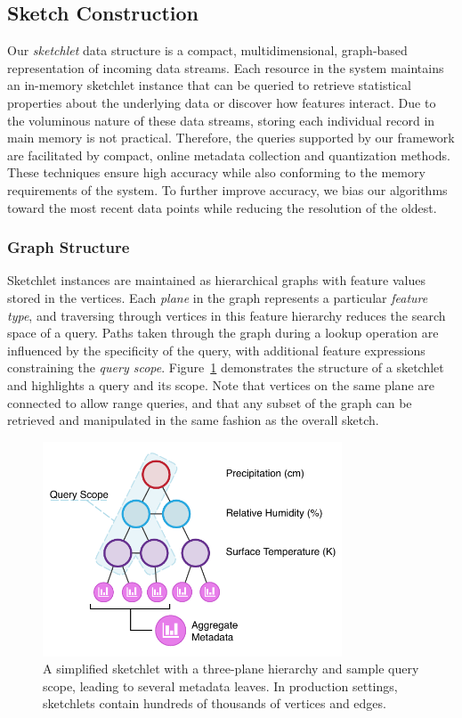 \subsection{Sketch Construction}
\label{sec:sketch}
Our \emph{sketchlet} data structure is a compact, multidimensional, graph-based representation of incoming data streams. Each resource in the system maintains an in-memory sketchlet instance that can be queried to retrieve statistical properties about the underlying data or discover how features interact. Due to the voluminous nature of these data streams, storing each individual record in main memory is not practical. Therefore, the queries supported by our framework are facilitated by compact, online metadata collection and quantization methods. These techniques ensure high accuracy while also conforming to the memory requirements of the system. To further improve accuracy, we bias our algorithms toward the most recent data points while reducing the resolution of the oldest.

\subsubsection{Graph Structure}
Sketchlet instances are maintained as hierarchical graphs with feature values stored in the vertices. Each \emph{plane} in the graph represents a particular \emph{feature type}, and traversing through vertices in this feature hierarchy reduces the search space of a query. Paths taken through the graph during a lookup operation are influenced by the specificity of the query, with additional feature expressions constraining the \emph{query scope}. Figure~\ref{fig:sketch} demonstrates the structure of a sketchlet and highlights a query and its scope. Note that vertices on the same plane are connected to allow range queries, and that any subset of the graph can be retrieved and manipulated in the same fashion as the overall sketch.

\begin{figure}[b!]
    \centerline{\includegraphics[width=3.5in]{figures/sketch.pdf}}
    \caption{A simplified sketchlet with a three-plane hierarchy and sample query scope, leading to several metadata leaves. In production settings, sketchlets contain hundreds of thousands of vertices and edges.}
    \label{fig:sketch}
\end{figure}


